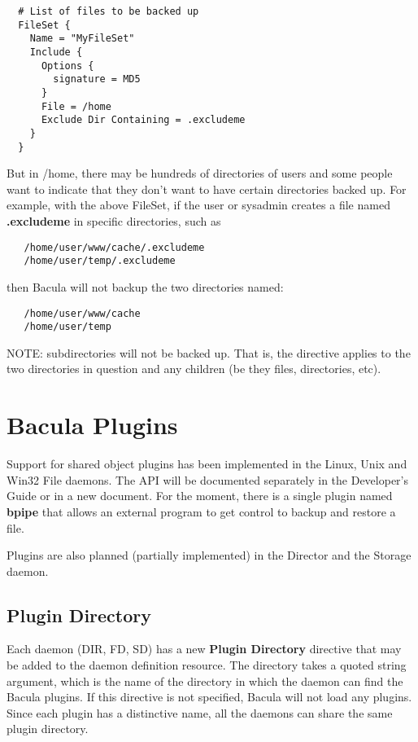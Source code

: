 \begin{verbatim}
  # List of files to be backed up
  FileSet {
    Name = "MyFileSet"
    Include {
      Options {
        signature = MD5
      }
      File = /home
      Exclude Dir Containing = .excludeme
    }
  }
\end{verbatim}

But in /home, there may be hundreds of directories of users and some
people want to indicate that they don't want to have certain
directories backed up. For example, with the above FileSet, if
the user or sysadmin creates a file named {\bf .excludeme} in 
specific directories, such as

\begin{verbatim}
   /home/user/www/cache/.excludeme
   /home/user/temp/.excludeme
\end{verbatim}

then Bacula will not backup the two directories named:

\begin{verbatim}
   /home/user/www/cache
   /home/user/temp
\end{verbatim}

NOTE: subdirectories will not be backed up.  That is, the directive
applies to the two directories in question and any children (be they
files, directories, etc).


\section{Bacula Plugins}
Support for shared object plugins has been implemented in the Linux, Unix
and Win32 File daemons. The API will be documented separately in
the Developer's Guide or in a new document.  For the moment, there is
a single plugin named {\bf bpipe} that allows an external program to
get control to backup and restore a file.

Plugins are also planned (partially implemented) in the Director and the
Storage daemon.  

\subsection{Plugin Directory}
Each daemon (DIR, FD, SD) has a new {\bf Plugin Directory} directive that may
be added to the daemon definition resource. The directory takes a quoted 
string argument, which is the name of the directory in which the daemon can
find the Bacula plugins. If this directive is not specified, Bacula will not
load any plugins. Since each plugin has a distinctive name, all the daemons
can share the same plugin directory. 

